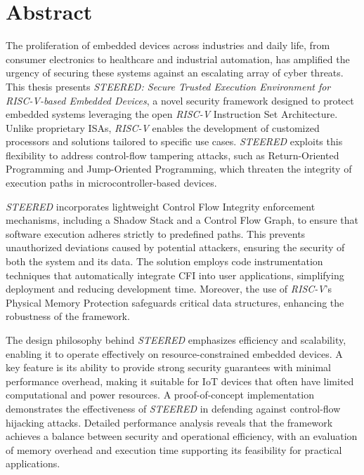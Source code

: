 \chapter*{Abstract}
\label{cha:abtract}

The proliferation of embedded devices across industries and daily life, from consumer
electronics to healthcare and industrial automation, has amplified the urgency
of securing these systems against an escalating array of cyber threats. This thesis
presents \textit{STEERED: Secure Trusted Execution Environment for RISC-V-based Embedded
Devices}, a novel security framework designed to protect embedded systems leveraging
the open \textit{RISC-V} Instruction Set Architecture. Unlike proprietary ISAs,
\textit{RISC-V} enables the development of customized processors and solutions tailored
to specific use cases. \textit{STEERED} exploits this flexibility to address control-flow
tampering attacks, such as Return-Oriented Programming and Jump-Oriented
Programming, which threaten the integrity of execution paths in microcontroller-based
devices.

\textit{STEERED} incorporates lightweight Control Flow Integrity enforcement
mechanisms, including a Shadow Stack and a Control Flow Graph, to ensure that
software execution adheres strictly to predefined paths. This prevents unauthorized
deviations caused by potential attackers, ensuring the security of both the
system and its data. The solution employs code instrumentation techniques that automatically
integrate CFI into user applications, simplifying deployment and reducing
development time. Moreover, the use of \textit{RISC-V}'s Physical Memory Protection
safeguards critical data structures, enhancing the robustness of the framework.

The design philosophy behind \textit{STEERED} emphasizes efficiency and scalability,
enabling it to operate effectively on resource-constrained embedded devices. A key
feature is its ability to provide strong security guarantees with minimal performance
overhead, making it suitable for IoT devices that often have limited
computational and power resources. A proof-of-concept implementation demonstrates
the effectiveness of \textit{STEERED} in defending against control-flow
hijacking attacks. Detailed performance analysis reveals that the framework achieves
a balance between security and operational efficiency, with an evaluation of
memory overhead and execution time supporting its feasibility for practical
applications.

